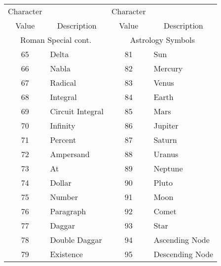 \newpage
\begin{tabular}{|c|l|c|l|}
\hline
\multicolumn{1}{|c|}{Character}
& & \multicolumn{1}{|c|}{Character}&\\
\multicolumn{1}{|c|}{Value}
&\multicolumn{1}{|c|}{Description}
&\multicolumn{1}{|c|}{Value}
&\multicolumn{1}{|c|}{Description}\\
\hline
\multicolumn{2}{|c|}{Roman Special cont.}
&\multicolumn{2}{|c|}{Astrology Symbols}\\
\hline
65 & Delta & 81 & Sun\\
66 & Nabla & 82 & Mercury\\
67 & Radical & 83 & Venus\\
68 & Integral & 84 & Earth\\
69 & Circuit Integral & 85 & Mars\\
70 & Infinity & 86 & Jupiter\\
71 & Percent & 87 & Saturn\\
72 & Ampersand & 88 & Uranus\\
73 & At & 89 & Neptune\\
74 & Dollar & 90 & Pluto\\
75 & Number & 91 & Moon\\
76 & Paragraph & 92 & Comet\\
77 & Daggar & 93 & Star\\
78 & Double Daggar & 94 & Ascending Node\\
79 & Existence & 95 & Descending Node\\ \hline
\end{tabular}
\newpage
